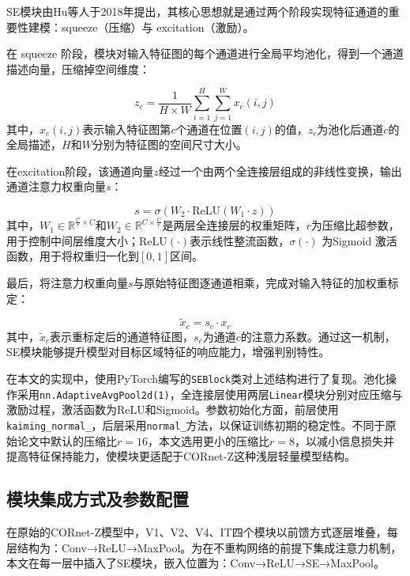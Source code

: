 SE模块由Hu等人于2018年提出\cite{hu2018squeeze}，其核心思想就是通过两个阶段实现特征通道的重要性建模：squeeze（压缩）与 excitation（激励）。

在 squeeze 阶段，模块对输入特征图的每个通道进行全局平均池化，得到一个通道描述向量，压缩掉空间维度：

\begin{equation}
	z_c = 
	\frac{1}{H \times W} 
	\sum_{i=1}^{H} \sum_{j=1}^{W} x_c(i, j)
	\label{eq:se_squeeze}
\end{equation}
其中，$x_c(i,j)$表示输入特征图第$c$个通道在位置$(i,j)$的值，$z_c$为池化后通道$c$的全局描述，$H$和$W$分别为特征图的空间尺寸大小。

在excitation阶段，该通道向量$z$经过一个由两个全连接层组成的非线性变换，输出通道注意力权重向量$s$：

\begin{equation}
	s = \sigma \left( W_2 \cdot \text{ReLU} \left( W_1 \cdot z \right) \right)
	\label{eq:se_excitation}
\end{equation}
其中，$W_1 \in \mathbb{R}^{\frac{C}{r} \times C}$和$W_2 \in \mathbb{R}^{C \times \frac{C}{r}}$是两层全连接层的权重矩阵，$r$为压缩比超参数，用于控制中间层维度大小；$\text{ReLU}(\cdot)$表示线性整流函数，$\sigma(\cdot)$ 为Sigmoid 激活函数，用于将权重归一化到$[0,1]$区间。

最后，将注意力权重向量$s$与原始特征图逐通道相乘，完成对输入特征的加权重标定：

\begin{equation}
	\tilde{x}_c = s_c \cdot x_c
	\label{eq:se_scale}
\end{equation}
其中，$\tilde{x}_c$表示重标定后的通道特征图，$s_c$为通道$c$的注意力系数。通过这一机制，SE模块能够提升模型对目标区域特征的响应能力，增强判别特性。

在本文的实现中，使用PyTorch编写的\texttt{SEBlock}类对上述结构进行了复现。池化操作采用\texttt{nn.AdaptiveAvgPool2d(1)}，全连接层使用两层\texttt{Linear}模块分别对应压缩与激励过程，激活函数为ReLU和Sigmoid。参数初始化方面，前层使用\texttt{kaiming\_normal\_}，后层采用\texttt{normal\_}方法，以保证训练初期的稳定性。不同于原始论文中默认的压缩比$r=16$，本文选用更小的压缩比$r=8$，以减小信息损失并提高特征保持能力，使模块更适配于CORnet-Z这种浅层轻量模型结构。

\subsection{模块集成方式及参数配置}

在原始的CORnet-Z模型中，V1、V2、V4、IT四个模块以前馈方式逐层堆叠，每层结构为：Conv→ReLU→MaxPool。为在不重构网络的前提下集成注意力机制，本文在每一层中插入了SE模块，嵌入位置为：Conv→ReLU→SE→MaxPool。

